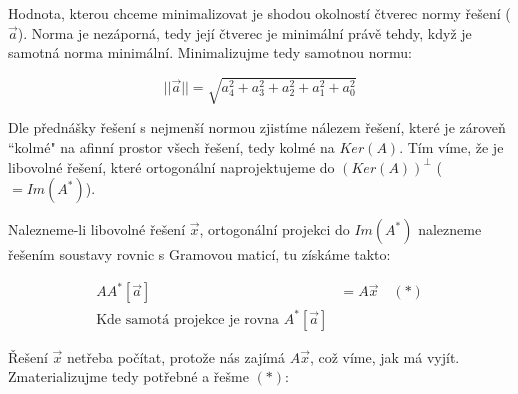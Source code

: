 \documentclass[12pt]{article}
\begin{document}
Hodnota, kterou chceme minimalizovat je shodou okolností čtverec normy řešení ($\vec{a}$).
Norma je nezáporná, tedy její čtverec je minimální právě tehdy, když je samotná norma minimální.
Minimalizujme tedy samotnou normu:

\[
 ||\vec{a}|| = \sqrt{a_4^2 + a_3^2 + a_2^2 + a_1^2 + a_0^2}
\]

Dle přednášky řešení s nejmenší normou zjistíme nálezem řešení, které
je zároveň ``kolmé" na afinní prostor všech řešení, tedy kolmé
na $Ker(A)$. Tím víme, že je libovolné řešení, které ortogonální naprojektujeme
do $(Ker(A))^\perp$ \quad ($= Im(A^*)$).

Nalezneme-li libovolné řešení $\vec{x}$, ortogonální projekci do $Im(A^*)$ nalezneme
řešením soustavy rovnic s Gramovou maticí, tu získáme takto:

\begin{align*}
  AA^*[\vec{a}] &= A\vec{x} \quad (*)\\
  \text{Kde samotá projekce je rovna }A^*[\vec{a}]
\end{align*}

Řešení $\vec{x}$ netřeba počítat, protože nás zajímá $A\vec{x}$, což víme, jak má vyjít.
Zmaterializujme tedy potřebné a řešme $(*)$:
\end{document}
